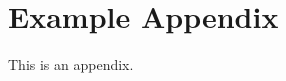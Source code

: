 \documentclass[11pt]{article}
\begin{document}
%


\appendix

\section{Example Appendix}
\label{sec:appendix}

This is an appendix.
\end{document}
